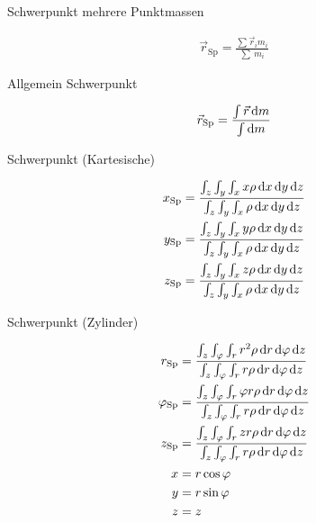 \begin{boxleft}Schwerpunkt mehrere Punktmassen
\end{boxleft}\begin{boxrightshaded}
\begin{align}
\vec{r}_{\text{Sp}}=\frac{\sum\vec{r}_i m_i}{\sum\ m_i}
\end{align}
\end{boxrightshaded}

\begin{boxleft}Allgemein Schwerpunkt
\end{boxleft}\begin{boxrightshaded}
\begin{align}
\vec{r}_{\text{Sp}}=\frac{\int \vec{r}\mathop{}\!\mathrm{d} m}{\int \mathop{}\!\mathrm{d} m}
\end{align}
\end{boxrightshaded}

\begin{boxleft}Schwerpunkt (Kartesische)
\end{boxleft}\begin{boxrightshaded}
\begin{align}
x_{\text{Sp}}&=\frac{\int_z\int_y\int_x x\rho \diff x \diff y \diff z }{\int_z\int_y\int_x \rho \diff x \diff y \diff z }\\
y_{\text{Sp}}&=\frac{\int_z\int_y\int_x y\rho \diff x \diff y \diff z }{\int_z\int_y\int_x \rho \diff x \diff y \diff z }\\
z_{\text{Sp}}&=\frac{\int_z\int_y\int_x z\rho \diff x \diff y \diff z }{\int_z\int_y\int_x \rho \diff x \diff y \diff z }
\end{align}
\end{boxrightshaded}

\begin{boxleft}Schwerpunkt (Zylinder)
\end{boxleft}\begin{boxrightshaded}
\begin{align}
r_{\text{Sp}}&=\frac{\int_z\int_\varphi\int_r r^2\rho \diff r \diff \varphi \diff z }{\int_z\int_\varphi\int_r r\rho \diff r \diff \varphi \diff z }\\
\varphi_{\text{Sp}}&=\frac{\int_z\int_\varphi\int_r \varphi r\rho \diff r \diff \varphi \diff z }{\int_z\int_\varphi\int_r r\rho \diff r \diff \varphi \diff z }\\
z_{\text{Sp}}&=\frac{\int_z\int_\varphi\int_r z r\rho \diff r \diff \varphi \diff z }{\int_z\int_\varphi\int_r r\rho \diff r \diff \varphi \diff z }\\
x&=r\cos{\varphi}\\
y&=r\sin{\varphi}\\
z&=z
\end{align}
\end{boxrightshaded}

